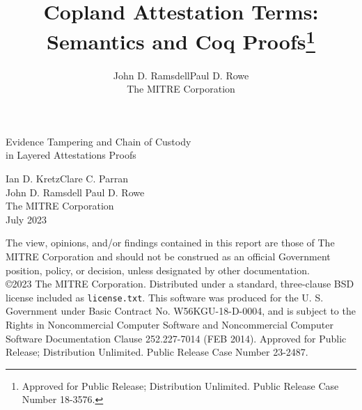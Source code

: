 \documentclass[12pt]{report}
\title{Copland Attestation Terms:\\
  Semantics and Coq Proofs\thanks{Approved for Public Release;
    Distribution Unlimited. Public Release Case Number 18-3576.}}
\author{John D. Ramsdell\qquad\qquad Paul D. Rowe\\[3ex]
  The MITRE Corporation}
\begin{document}
\begin{titlepage}
  \vspace*{7ex}
  \begin{center}\LARGE
    Evidence Tampering and Chain of Custody\\
    in Layered Attestations Proofs
  \end{center}
  \vspace{3ex}
  \begin{center}\Large
    Ian D. Kretz\qquad Clare C. Parran\\
    John D. Ramsdell \qquad Paul D. Rowe\\[3ex]
    The MITRE Corporation\\[3ex]
    July 2023
  \end{center}
  \vfill The view, opinions, and/or findings contained in this report
  are those of The MITRE Corporation and should not be construed as an
  official Government position, policy, or decision, unless designated
  by other documentation.\\ \copyright 2023 The MITRE Corporation.
  Distributed under a standard, three-clause BSD license included as
  \texttt{license.txt}.  This software was produced for the
  U. S. Government under Basic Contract No. W56KGU-18-D-0004, and is
  subject to the Rights in Noncommercial Computer Software and
  Noncommercial Computer Software Documentation Clause 252.227-7014
  (FEB 2014). Approved for Public Release; Distribution
  Unlimited. Public Release Case Number 23-2487.
\end{titlepage}

\end{document}
